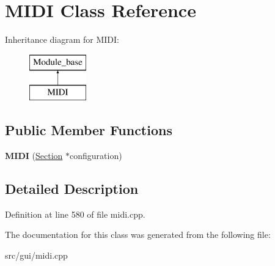 \hypertarget{classMIDI}{\section{M\-I\-D\-I Class Reference}
\label{classMIDI}
}
Inheritance diagram for M\-I\-D\-I\-:\begin{figure}[H]
\begin{center}
\leavevmode
\includegraphics[height=2.000000cm]{classMIDI}
\end{center}
\end{figure}
\subsection*{Public Member Functions}
\begin{DoxyCompactItemize}
\item 
\hypertarget{classMIDI_a0391b055740242a2cb9fb8d45d85411f}{{\bfseries M\-I\-D\-I} (\hyperlink{classSection}{Section} $\ast$configuration)}\label{classMIDI_a0391b055740242a2cb9fb8d45d85411f}

\end{DoxyCompactItemize}


\subsection{Detailed Description}


Definition at line 580 of file midi.\-cpp.



The documentation for this class was generated from the following file\-:\begin{DoxyCompactItemize}
\item 
src/gui/midi.\-cpp\end{DoxyCompactItemize}

